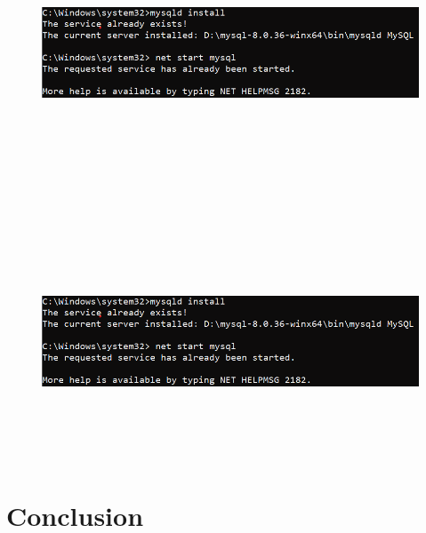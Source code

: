 \documentclass{ctexart}
\begin{document}
\subsubsection{}
\begin{lstlisting}[language=sql]
	
\end{lstlisting}
\begin{figure}[H]
	\centering 
	\includegraphics[height=7cm,width=14cm]{1.png}
	\end{figure}
\subsubsection{}
\begin{lstlisting}[language=sql]
	
\end{lstlisting}
\begin{figure}[H]
	\centering 
	\includegraphics[height=7cm,width=14cm]{1.png}
	\end{figure}
	\section{Conclusion}
    
\end{document}
